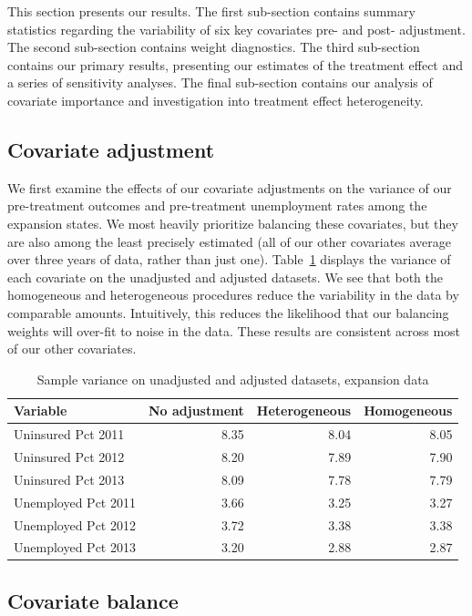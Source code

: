 This section presents our results. The first sub-section contains summary statistics regarding the variability of six key covariates pre- and post- adjustment. The second sub-section contains weight diagnostics. The third sub-section contains our primary results, presenting our estimates of the treatment effect and a series of sensitivity analyses. The final sub-section contains our analysis of covariate importance and investigation into treatment effect heterogeneity.

\subsection{Covariate adjustment}

We first examine the effects of our covariate adjustments on the variance of our pre-treatment outcomes and pre-treatment unemployment rates among the expansion states. We most heavily prioritize balancing these covariates, but they are also among the least precisely estimated (all of our other covariates average over three years of data, rather than just one). Table~\ref{tab:adjust1} displays the variance of each covariate on the unadjusted and adjusted datasets. We see that both the homogeneous and heterogeneous procedures reduce the variability in the data by comparable amounts. Intuitively, this reduces the likelihood that our balancing weights will over-fit to noise in the data. These results are consistent across most of our other covariates.

\begin{table}[ht]
\caption{Sample variance on unadjusted and adjusted datasets, expansion data}
\label{tab:adjust1}
\begin{tabular}{lrrr}
  \hline
Variable & No adjustment & Heterogeneous & Homogeneous \\ 
  \hline
Uninsured Pct 2011 & 8.35 & 8.04 & 8.05 \\ 
  Uninsured Pct 2012 & 8.20 & 7.89 & 7.90 \\ 
  Uninsured Pct 2013 & 8.09 & 7.78 & 7.79 \\ 
  Unemployed Pct 2011 & 3.66 & 3.25 & 3.27 \\ 
  Unemployed Pct 2012 & 3.72 & 3.38 & 3.38 \\ 
  Unemployed Pct 2013 & 3.20 & 2.88 & 2.87 \\ 
   \hline
\end{tabular}
\end{table}

\subsection{Covariate balance}

